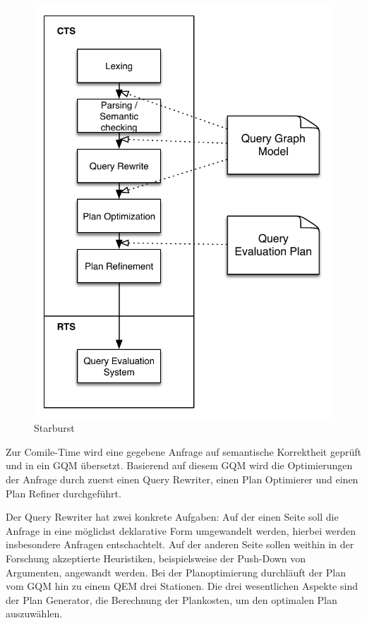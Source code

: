 \begin{figure}[h]
  \centering
  \includegraphics{03_Related_Work/StarburstFlow.pdf}
  \caption{Starburst}
\end{figure}

Zur Comile-Time wird eine gegebene Anfrage auf semantische Korrektheit geprüft und in ein \ac{GQM} übersetzt. Basierend auf diesem \ac{GQM} wird die Optimierungen der Anfrage durch zuerst einen Query Rewriter, einen Plan Optimierer und einen Plan Refiner durchgeführt.

Der Query Rewriter hat zwei konkrete Aufgaben: Auf der einen Seite soll die Anfrage in eine möglichst deklarative Form umgewandelt werden, hierbei werden insbesondere Anfragen entschachtelt. Auf der anderen Seite sollen weithin in der Forschung akzeptierte Heuristiken, beispielsweise der Push-Down von Argumenten, angewandt werden.
Bei der Planoptimierung durchläuft der Plan vom \ac{GQM} hin zu einem QEM drei Stationen. Die drei wesentlichen Aspekte sind der Plan Generator, die Berechnung der Plankosten, um den optimalen Plan auszuwählen. 

